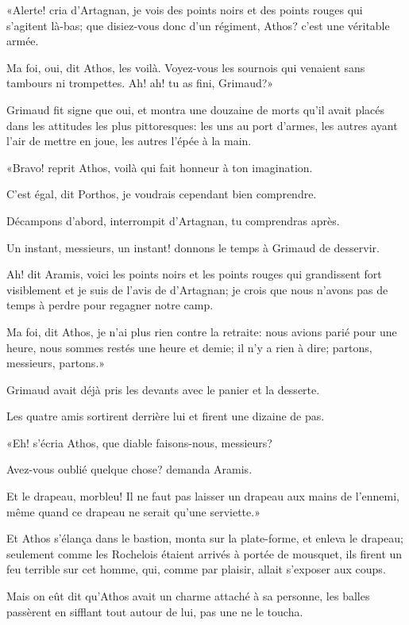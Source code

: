 «Alerte! cria d'Artagnan, je vois des points noirs et des points rouges qui s'agitent là-bas; que disiez-vous donc d'un régiment, Athos? c'est une véritable armée. 

\speak  Ma foi, oui, dit Athos, les voilà. Voyez-vous les sournois qui venaient sans tambours ni trompettes. Ah! ah! tu as fini, Grimaud?» 

Grimaud fit signe que oui, et montra une douzaine de morts qu'il avait placés dans les attitudes les plus pittoresques: les uns au port d'armes, les autres ayant l'air de mettre en joue, les autres l'épée à la main. 

«Bravo! reprit Athos, voilà qui fait honneur à ton imagination. 

\speak  C'est égal, dit Porthos, je voudrais cependant bien comprendre. 

\speak  Décampons d'abord, interrompit d'Artagnan, tu comprendras après. 

\speak  Un instant, messieurs, un instant! donnons le temps à Grimaud de desservir. 

\speak  Ah! dit Aramis, voici les points noirs et les points rouges qui grandissent fort visiblement et je suis de l'avis de d'Artagnan; je crois que nous n'avons pas de temps à perdre pour regagner notre camp. 

\speak  Ma foi, dit Athos, je n'ai plus rien contre la retraite: nous avions parié pour une heure, nous sommes restés une heure et demie; il n'y a rien à dire; partons, messieurs, partons.» 

Grimaud avait déjà pris les devants avec le panier et la desserte. 

Les quatre amis sortirent derrière lui et firent une dizaine de pas. 

«Eh! s'écria Athos, que diable faisons-nous, messieurs? 

\speak  Avez-vous oublié quelque chose? demanda Aramis. 

\speak  Et le drapeau, morbleu! Il ne faut pas laisser un drapeau aux mains de l'ennemi, même quand ce drapeau ne serait qu'une serviette.» 

Et Athos s'élança dans le bastion, monta sur la plate-forme, et enleva le drapeau; seulement comme les Rochelois étaient arrivés à portée de mousquet, ils firent un feu terrible sur cet homme, qui, comme par plaisir, allait s'exposer aux coups. 

Mais on eût dit qu'Athos avait un charme attaché à sa personne, les balles passèrent en sifflant tout autour de lui, pas une ne le toucha. 

